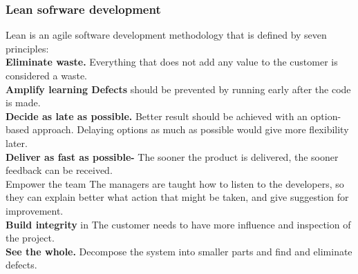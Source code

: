 \subsubsection{Lean sofrware development}
Lean is an agile software development methodology that is defined by seven principles:\\
\textbf{Eliminate waste.} Everything that does not add any value to the customer is considered a waste.\\
\textbf{Amplify learning Defects} should be prevented by running early after the code is made.\\
\textbf{Decide as late as possible.} Better result should be achieved with an option-based approach. Delaying options as much as possible would give more flexibility later.\\
\textbf{Deliver as fast as possible-} The sooner the product is delivered, the sooner feedback can be received.\\
Empower the team The managers are taught how to listen to the developers, so they can explain better what action that might be taken, and give suggestion for improvement.\\
\textbf{Build integrity} in The customer needs to have more influence and inspection of the project.\\
\textbf{See the whole.} Decompose the system into smaller parts and find and eliminate defects.